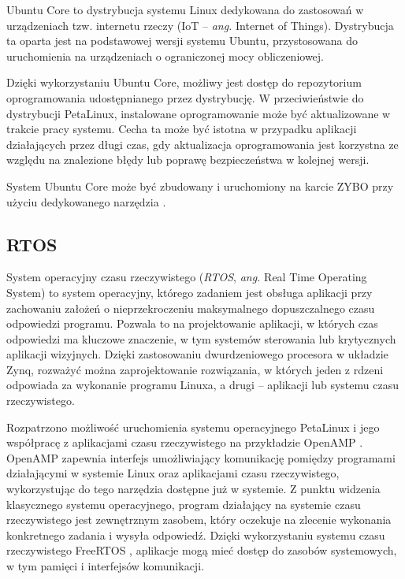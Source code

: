 Ubuntu Core to dystrybucja systemu Linux dedykowana do zastosowań w urządzeniach tzw. internetu rzeczy (IoT -- \emph{ang.} Internet of Things). %
Dystrybucja ta oparta jest na podstawowej wersji systemu Ubuntu, przystosowana do uruchomienia na urządzeniach o ograniczonej mocy obliczeniowej.

Dzięki wykorzystaniu Ubuntu Core, możliwy jest dostęp do repozytorium oprogramowania udostępnianego przez dystrybucję. 
W przeciwieństwie do dystrybucji PetaLinux, instalowane oprogramowanie może być aktualizowane w trakcie pracy systemu. 
Cecha ta może być istotna w przypadku aplikacji działających przez długi czas, gdy aktualizacja oprogramowania jest korzystna ze względu na znalezione błędy lub poprawę bezpieczeństwa w kolejnej wersji. %

System Ubuntu Core może być zbudowany i uruchomiony na karcie ZYBO przy użyciu dedykowanego narzędzia \cite{ubuntu-core-zybo}.

\subsection{RTOS}

System operacyjny czasu rzeczywistego (\emph{RTOS}, \emph{ang.} Real Time Operating System) to system operacyjny, którego zadaniem jest obsługa aplikacji przy zachowaniu założeń o nieprzekroczeniu maksymalnego dopuszczalnego czasu odpowiedzi programu. 
Pozwala to na projektowanie aplikacji, w których czas odpowiedzi ma kluczowe znaczenie, w tym systemów sterowania lub krytycznych aplikacji wizyjnych.
Dzięki zastosowaniu dwurdzeniowego procesora w układzie Zynq, rozważyć można zaprojektowanie rozwiązania, w których jeden z rdzeni odpowiada za wykonanie programu Linuxa, a drugi -- aplikacji lub systemu czasu rzeczywistego. %

Rozpatrzono możliwość uruchomienia systemu operacyjnego PetaLinux i jego współpracę z aplikacjami czasu rzeczywistego na przykładzie OpenAMP \cite{openamp-home}. 
OpenAMP zapewnia interfejs umożliwiający komunikację pomiędzy programami działającymi w systemie Linux oraz aplikacjami czasu rzeczywistego, wykorzystując do tego narzędzia dostępne już w systemie.
Z punktu widzenia klasycznego systemu operacyjnego, program działający na systemie czasu rzeczywistego jest zewnętrznym zasobem, który oczekuje na zlecenie wykonania konkretnego zadania i wysyła odpowiedź.
Dzięki wykorzystaniu systemu czasu rzeczywistego FreeRTOS \cite{freeRTOS-home}, aplikacje mogą mieć dostęp do zasobów systemowych, w tym pamięci i interfejsów komunikacji.

